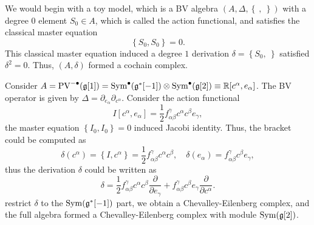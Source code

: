 \documentclass[10pt]{article}
\begin{document}
We would begin with a toy model, which is a BV algebra $\left( A, \Delta, \left\{ ~,~ \right\} \right)$ with a degree $ 0 $ element $ S_0 \in A$, which is called the action functional, and satisfies the classical master equation
\begin{equation*}
  \left\{ S_0, S_0 \right\} = 0.
\end{equation*}
This classical master equation induced a degree $ 1$ derivation $ \delta = \left\{ S_0, ~ \right\}$ satisfied $ \delta^{2} = 0$.
Thus, $\left( A, \delta \right)$ formed a cochain complex.
\begin{example}
  Consider $ A = \mathrm{PV}^{-\bullet}(\mathfrak{g}[1]) = \operatorname{Sym}^{\bullet}(\mathfrak{g}^{*}[-1]) \otimes \operatorname{Sym}^{\bullet}(\mathfrak{g}[2]) \equiv \mathbb{R}[c^{\alpha}, e_{\alpha}]$.
  The BV operator is given by $ \Delta = \partial_{e_{\alpha}} \partial_{c^{\alpha}}$.
  Consider the action functional
  \begin{equation*}
    I[c^{\alpha}, e_{\alpha}] = \frac{1}{2} f_{\alpha \beta}^{\gamma} c^{\alpha} c^{\beta} e_{\gamma},
  \end{equation*}
  the master equation $\left\{ I_0, I_0 \right\} = 0$ induced Jacobi identity. Thus, the bracket could be computed as
  \begin{equation*}
    \delta(c^{\alpha}) = \left\{ I, c^{\alpha} \right\} = \frac{1}{2} f_{\alpha \beta}^{\gamma} c^{\alpha} c^{\beta}, \quad \delta(e_{\alpha}) = f_{\alpha \beta}^{\gamma} c^{\beta} e_{\gamma},
  \end{equation*}
  thus the derivation $\delta$ could be written as
  \begin{equation*}
    \delta = \frac{1}{2} f_{\alpha \beta}^{\gamma} c^{\alpha} c^{\beta} \frac{\partial }{\partial e_{\gamma}} + f_{\alpha \beta}^{\gamma} c^{\beta} e_{\gamma} \frac{\partial }{\partial c^{\alpha}}.
  \end{equation*}
  restrict $ \delta$ to the $\operatorname{Sym}(\mathfrak{g}^{*}[-1])$ part, we obtain a Chevalley-Eilenberg complex, and the full algebra formed a Chevalley-Eilenberg complex with module $\operatorname{Sym}(\mathfrak{g}[2])$.
\end{example}
\end{document}
